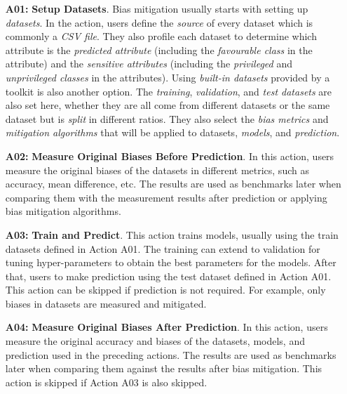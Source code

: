 \documentclass[sigconf,review]{acmart}
\begin{document}
\begin{itemize}
\item[\textbf{A01:}] \textbf{Setup Datasets}. Bias mitigation usually starts with setting up \textit{datasets}. In the action, users define the \textit{source} of every dataset which is commonly a \textit{CSV file}. They also profile each dataset to determine which attribute is the \textit{predicted attribute} (including the \textit{favourable class} in the attribute) and the \textit{sensitive attributes} (including the \textit{privileged} and \textit{unprivileged classes} in the attributes). Using \textit{built-in datasets} provided by a toolkit is also another option. 
The \textit{training}, \textit{validation}, and \textit{test datasets} are also set here, whether they are all come from different datasets or the same dataset but is \textit{split} in different ratios. They also select the \textit{bias metrics} and \textit{mitigation algorithms} that will be applied to datasets, \textit{models}, and \textit{prediction}. 

\item[\textbf{A02:}] \textbf{Measure Original Biases Before Prediction}. In this action, users measure the original biases of the datasets in different metrics, such as accuracy, mean difference, etc. The results are used as benchmarks later when comparing them with the measurement results after prediction or applying bias mitigation algorithms.  

\item[\textbf{A03:}] \textbf{Train and Predict}. This action trains models, usually using the train datasets defined in Action A01. The training can extend to validation for tuning hyper-parameters to obtain the best parameters for the models. After that, users to make prediction
using the test dataset defined in Action A01. This action can be skipped if prediction is not required. For example, only biases in datasets are measured and mitigated.

\item[\textbf{A04:}] \textbf{Measure Original Biases After Prediction}. 
In this action, users measure the original accuracy and biases of the datasets, models, and prediction used in the preceding actions. The results are used as benchmarks later when comparing them against the results after bias mitigation. This action is skipped if Action A03 is also skipped.


\end{itemize}
\end{document}
